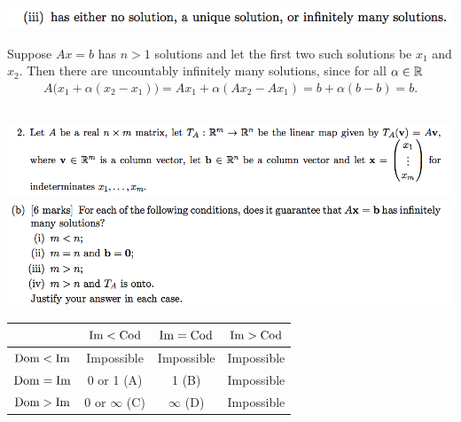 \documentclass[12pt]{article}
\begin{document}
\subsubsection*{} %
\begin{mdframed}
\includegraphics[width=400pt]{img/oxford-prelims-2017-A-2-1-3.png}
\end{mdframed}

Suppose $Ax = b$ has $n > 1$ solutions and let the first two such solutions be
$x_1$ and $x_2$. Then there are uncountably infinitely many solutions, since
for all $\alpha \in \mathbb{R}$
\begin{align*}
A\Big(x_1 + \alpha (x_2 - x_1)\Big) = Ax_1 + \alpha(Ax_2 - Ax_1) = b + \alpha(b - b) = b.
\end{align*}

\newpage
\subsection*{} %
\begin{mdframed}
\includegraphics[width=400pt]{img/oxford-prelims-2017-A-2-2-0.png}\\
\includegraphics[width=400pt]{img/oxford-prelims-2017-A-2-2.png}
\end{mdframed}

\begin{table}[h]
  \centering
  \begin{tabular}{|c|c|c|c|}
    $          $ & $\operatorname{\mathrm{Im}} < \operatorname{\mathrm{Cod}}$      & $\operatorname{\mathrm{Im}} = \operatorname{\mathrm{Cod}}$   & $\operatorname{\mathrm{Im}} > \operatorname{\mathrm{Cod}}$\\
    \hline
    $\operatorname{\mathrm{Dom}} < \operatorname{\mathrm{Im}}$ & Impossible        & Impossible     & Impossible  \\
    $\operatorname{\mathrm{Dom}} = \operatorname{\mathrm{Im}}$ & 0 or 1 (A)        & 1 (B)          & Impossible  \\
    $\operatorname{\mathrm{Dom}} > \operatorname{\mathrm{Im}}$ & 0 or $\infty$ (C) & $\infty$ (D)   & Impossible  \\
  \end{tabular}
\end{table}
\end{document}

